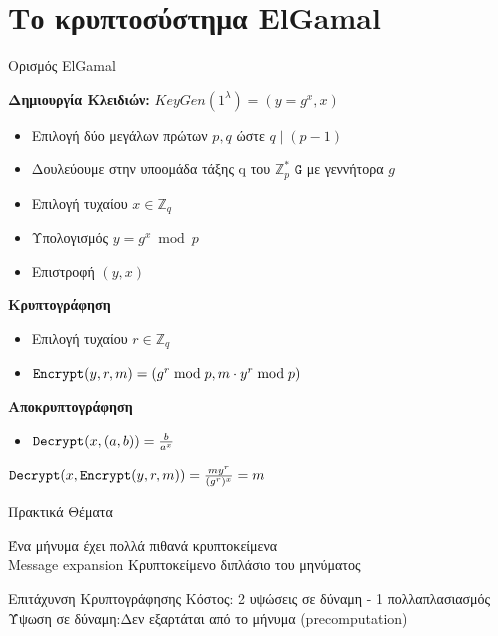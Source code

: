 \documentclass[handout]{beamer}
\begin{document}
\section{Το κρυπτοσύστημα ElGamal}
\begin{frame}{Ορισμός ElGamal}
 
\textbf{Δημιουργία Κλειδιών:}
$KeyGen(1^{\lambda}) = (y=g^x,x)$
\begin{itemize}
\item Επιλογή δύο μεγάλων πρώτων $p,q$ ώστε $q \mid (p-1)$  
\item Δουλεύουμε στην υποομάδα τάξης q του $\mathbb{Z}_p^*$ $\mathtt{G}$ με γεννήτορα $g$
\item Επιλογή τυχαίου $x \in \mathbb{Z}_q$
\item Υπολογισμός $y = g^x \bmod{p}$
\item Επιστροφή $(y,x)$
\end{itemize}
\pause
 
\textbf{Κρυπτογράφηση} 
\begin{itemize}
\item Επιλογή τυχαίου $r \in \mathbb{Z}_q$
\item $\mathtt{Encrypt}(y,r,m) = (g^r \bmod p, m \cdot y^r \bmod p)$
\end{itemize}
\pause

\textbf{Αποκρυπτογράφηση}
\begin{itemize}
\item $\mathtt{Decrypt}(x, (a,b)) = \frac{b}{a^x}$
\end{itemize} 
\pause
 
\begin{block}{}
$\mathtt{Decrypt}(x, \mathtt{Encrypt}(y,r,m))= \frac{m y^r}{(g^r)^x} = m$
\end{block}

\end{frame}

\begin{frame}{Πρακτικά Θέματα}

 Ένα μήνυμα έχει πολλά πιθανά κρυπτοκείμενα \\
\pause
\alert{Message expansion} Κρυπτοκείμενο διπλάσιο του μηνύματος \\
\pause
\begin{block}{Επιτάχυνση Κρυπτογράφησης}
Κόστος: 2 υψώσεις σε δύναμη - 1 πολλαπλασιασμός\\
Ύψωση σε δύναμη:Δεν εξαρτάται από το μήνυμα (precomputation)
\end{block}

\end{frame}
\end{document}
